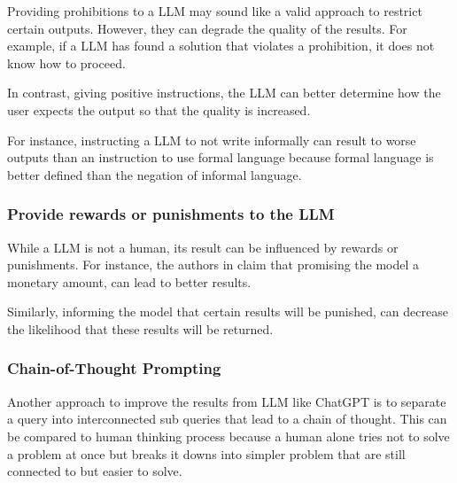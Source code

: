 Providing prohibitions to a \ac{LLM} may sound like a valid approach to restrict certain outputs. However, they can degrade the quality of the results. For example, if a \ac{LLM} has found a solution that violates a prohibition, it does not know how to proceed. 

In contrast, giving positive instructions, the \ac{LLM} can better determine how the user expects the output so that the quality is increased.

For instance, instructing a \ac{LLM} to not write informally can result to worse outputs than an instruction to use formal language because formal language is better defined than the negation of informal language. \cite{prompt_engineering_jonathan}

\subsubsection{Provide rewards or punishments to the LLM}

While a \ac{LLM} is not a human, its result can be influenced by rewards or punishments. For instance, the authors in \cite{bsharat2023principled} claim that promising the model a monetary amount, can lead to better results. 

Similarly, informing the model that certain results will be punished, can decrease the likelihood that these results will be returned. \cite{bsharat2023principled}

\subsubsection{Chain-of-Thought Prompting}\label{sec:chain of thought}

Another approach to improve the results from \ac{LLM} like ChatGPT is to separate a query into interconnected sub queries that lead to a chain of thought. This can be compared to human thinking process because a human alone tries not to solve a problem at once but breaks it downs into simpler problem that are still connected to but easier to solve. \cite{Wei2022ChainOT}

